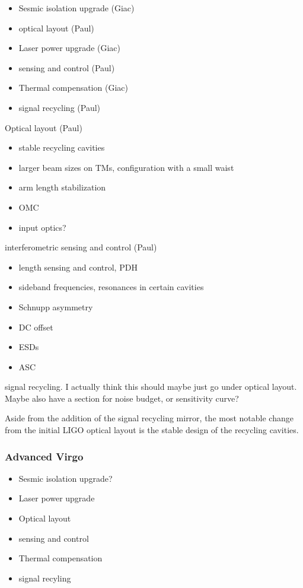 \begin{itemize}
\item Sesmic isolation upgrade (Giac)
\item optical layout (Paul)
\item Laser power upgrade (Giac)
\item sensing and control (Paul)
\item Thermal compensation (Giac)
\item signal recycling (Paul)
\end{itemize}

Optical layout (Paul)

\begin{itemize}
\item stable recycling cavities
\item larger beam sizes on TMs, configuration with a small waist
\item arm length stabilization
\item OMC
\item input optics?
\end{itemize}

interferometric sensing and control (Paul)

\begin{itemize}
\item length sensing and control, PDH
\item sideband frequencies, resonances in certain cavities
\item Schnupp asymmetry
\item DC offset
\item ESDs
\item ASC
\end{itemize}

signal recycling. I actually think this should maybe just go under optical layout.
Maybe also have a section for noise budget, or sensitivity curve?








Aside from the addition of the signal recycling mirror, the most notable change from the initial LIGO optical 
layout is the stable design of the recycling cavities.


\subsubsection{Advanced Virgo}
\begin{itemize}
\item Sesmic isolation upgrade?
\item Laser power upgrade
\item Optical layout
\item sensing and control
\item Thermal compensation
\item signal recyling
\end{itemize}
